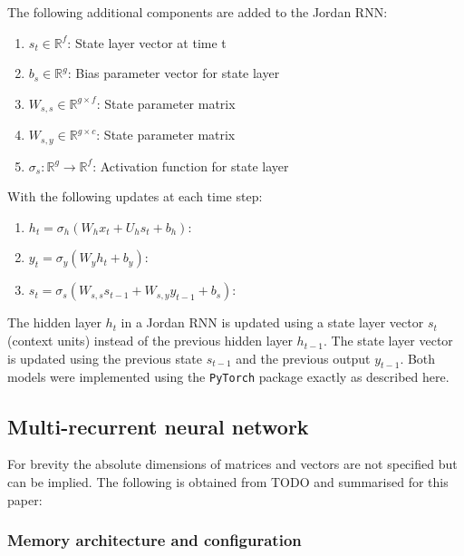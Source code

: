 \documentclass[conference]{IEEEtran}
\begin{document}
The following additional components are added to the Jordan RNN:

\begin{enumerate}
	\item $s_t \in \mathbb{R}^f$: State layer vector at time t
	
	\item $b_s \in \mathbb{R}^{g}$: Bias parameter vector for state layer
	
	\item $W_{s,s} \in \mathbb{R}^{g \times f}$: State parameter matrix
	\item $W_{s,y} \in \mathbb{R}^{g \times c}$: State parameter matrix
	
	\item $\sigma_s: \mathbb{R}^g \to \mathbb{R}^f$: Activation function for state layer
	
	
	
\end{enumerate}

With the following updates at each time step:

\begin{enumerate}
	\item $h_t = \sigma_h(W_h x_t + U_h s_t + b_h)$: 
	\item $y_t = \sigma_y(W_y h_t + b_y)$: 
	\item $s_t = \sigma_s(W_{s,s} s_{t-1} + W_{s,y} y_{t-1} + b_s)$: 
\end{enumerate}

The hidden layer $h_t$ in a Jordan RNN is updated using a state layer vector $s_t$ (context units) instead of the previous hidden layer $h_{t-1}$. The state layer vector is updated using the previous state $s_{t-1}$ and the previous output $y_{t-1}$. Both models were implemented using the \texttt{PyTorch} package exactly as described here.


\subsection{Multi-recurrent neural network}

For brevity the absolute dimensions of matrices and vectors are not specified but can be implied. The following is obtained from TODO and summarised for this paper:

\subsubsection{Memory architecture and configuration}
\end{document}
